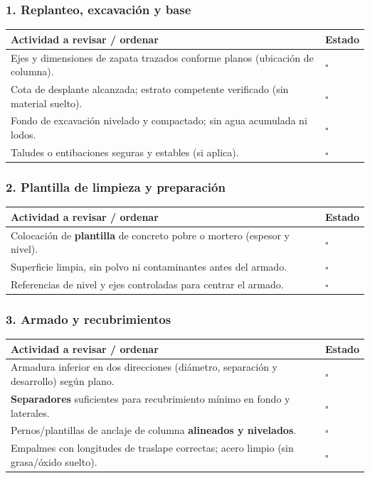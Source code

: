 \documentclass[12pt]{article}
\newcommand{\cbox}{\(\square\)}
\renewcommand{\cbox}{\(\square\)} %
\begin{document}
	\subsubsection*{1. Replanteo, excavación y base}
	\begin{tabularx}{\linewidth}{>{\raggedright\arraybackslash}p{0.93\linewidth} >{\centering\arraybackslash}m{0.07\linewidth}}
		\toprule
		\textbf{Actividad a revisar / ordenar} & \textbf{Estado}\\
		\midrule
		Ejes y dimensiones de zapata trazados conforme planos (ubicación de columna). & \cbox \\
		Cota de desplante alcanzada; estrato competente verificado (sin material suelto). & \cbox \\
		Fondo de excavación nivelado y compactado; sin agua acumulada ni lodos. & \cbox \\
		Taludes o entibaciones seguras y estables (si aplica). & \cbox \\
		\bottomrule
	\end{tabularx}
	
	\subsubsection*{2. Plantilla de limpieza y preparación}
	\begin{tabularx}{\linewidth}{>{\raggedright\arraybackslash}p{0.93\linewidth} >{\centering\arraybackslash}m{0.07\linewidth}}
		\toprule
		\textbf{Actividad a revisar / ordenar} & \textbf{Estado}\\
		\midrule
		Colocación de \textbf{plantilla} de concreto pobre o mortero (espesor y nivel). & \cbox \\
		Superficie limpia, sin polvo ni contaminantes antes del armado. & \cbox \\
		Referencias de nivel y ejes controladas para centrar el armado. & \cbox \\
		\bottomrule
	\end{tabularx}
	
	\subsubsection*{3. Armado y recubrimientos}
	\begin{tabularx}{\linewidth}{>{\raggedright\arraybackslash}p{0.93\linewidth} >{\centering\arraybackslash}m{0.07\linewidth}}
		\toprule
		\textbf{Actividad a revisar / ordenar} & \textbf{Estado}\\
		\midrule
		Armadura inferior en dos direcciones (diámetro, separación y desarrollo) según plano. & \cbox \\
		\textbf{Separadores} suficientes para recubrimiento mínimo en fondo y laterales. & \cbox \\
		Pernos/plantillas de anclaje de columna \textbf{alineados y nivelados}. & \cbox \\
		Empalmes con longitudes de traslape correctas; acero limpio (sin grasa/óxido suelto). & \cbox \\
		\bottomrule
	\end{tabularx}
	
\end{document}
